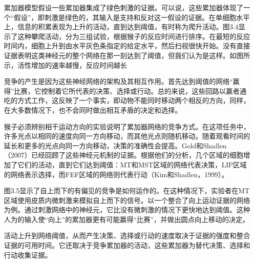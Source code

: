 累加器模型假设一些累加器集成了绿色刺激的证据。可以说，这些累加器体现了一个“假设”，即刺激是绿色的，其输入是支持和反对这一假设的证据。在单细胞水平上，信息的积累表现为上升的活动，直到达到阈值，有时称为爬升活动。图3.4显示了这种攀爬活动，分为三组试验，根据猴子的反应时间进行排序。在最短的反应时间内，细胞上升到由水平灰色条指定的给定水平，然后扫视很快开始。没有直接证据表明这类神经元的整个网络在那一刻达到了阈值，但我们认为是这样。如图所示，活性增加的速率越慢，反应时间越长\par
竞争的产生是因为这些神经网络的架构及其相互作用。首先达到阈值的网络“赢得”比赛，它控制着它所代表的决策、选择或行动。总的来说，这些回路以赢者通吃的方式工作，这反映了一个事实，即动物不能同时移动两个相反的方向，同样，在大多数情况下，也不会同时做出相互矛盾的决定和选择。\par
猴子必须辨别相干运动方向的实验说明了累加器网络的竞争方式。在这项任务中，许多光点以相同的速度向同一方向移动，而其他光点则随机移动。随着观看时间的延长和更多的光点向同一方向移动，决策的准确性会提高。Gold和Shadlen（2007）已经回顾了这些神经元机制的证据。根据他们的分析，几个区域的细胞增加了它们的活动，直到它们达到阈值：MT和MST区域的网络代表决策，LIP区域的网络表示选择，而FEF区域的网络则代表行动（Kim和Shadlen，1999）。\par
图3.5显示了自上而下的有偏见的竞争是如何运作的。在这种情况下，实验者在MT区域使用皮质内微刺激来模拟自上而下的信号。以一个整合了向上运动证据的网络为例。通过刺激网络中的神经元，它比没有微刺激的情况下更快地达到阈值。这种人为的输入使“向上”的累加器更有可能赢得“比赛”，并做出圆点向上移动的决定。\par
活动上升到网络阈值，从而产生决策、选择或行动的速度取决于证据的强度和整合证据的可用时间。它还取决于竞争累加器的活动，这些累加器为替代决策、选择和行动收集证据。\par
